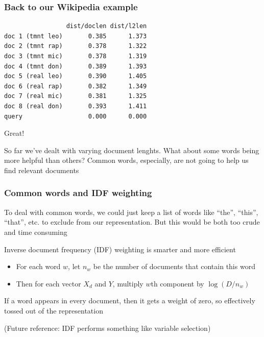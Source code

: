 \documentclass[mathserif]{beamer}
\def\red{\color[rgb]{0.8,0,0}}
\begin{document}
\begin{frame}[fragile]
\frametitle{Back to our Wikipedia example}
{\footnotesize
\begin{verbatim}
                 dist/doclen dist/l2len
doc 1 (tmnt leo)       0.385      1.373
doc 2 (tmnt rap)       0.378      1.322
doc 3 (tmnt mic)       0.378      1.319
doc 4 (tmnt don)       0.389      1.393
doc 5 (real leo)       0.390      1.405
doc 6 (real rap)       0.382      1.349
doc 7 (real mic)       0.381      1.325
doc 8 (real don)       0.393      1.411
query                  0.000      0.000
\end{verbatim}}

{\red Great!}

\bigskip
So far we've dealt with varying document lenghts.
What about some words being more helpful than
others? {\red Common words}, especially, are not
going to help us find relevant documents
\end{frame}

\begin{frame}
\frametitle{Common words and IDF weighting}
To deal with common words, we could just keep a list
of words like ``the'', ``this'', ``that'', etc. to
exclude from our representation. But
this would be both {\red too crude} and {\red time
consuming}

\bigskip
{\red Inverse document frequency (IDF)} weighting
is smarter and more efficient
\begin{itemize}
\item
For each word $w$, let $n_w$ be the number of 
documents that contain this word
\item
Then for each vector $X_d$ and $Y$, multiply 
$w$th component by 
$\log(D/n_w)$
\end{itemize}

\bigskip
If a word appears in every document, then it gets
a weight of zero, so effectively tossed out of the representation 

\bigskip
(Future reference: IDF performs something like
{\red variable selection})

\end{frame}
\end{document}
